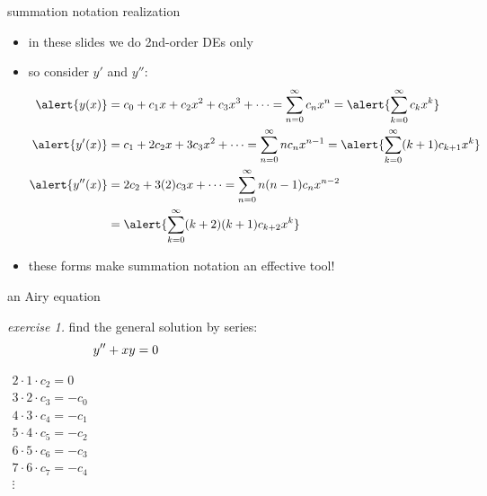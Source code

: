 \documentclass[dvipsnames,colorlinks]{beamer}
\begin{document}
\begin{frame}{summation notation realization}

\begin{itemize}
\item in these slides we do 2nd-order DEs only
\item so consider $y'$ and $y''$:
\small
\begin{align*}
\alert{y(x)} &= c_0 + c_1 x + c_2 x^2 + c_3 x^3 + \dots = \sum_{n=0}^\infty c_n x^n = \alert{\sum_{k=0}^\infty c_k x^k} \\
\alert{y'(x)} &= c_1 + 2 c_2 x + 3 c_3 x^2 + \dots = \sum_{n=0}^\infty n c_n x^{n-1} = \alert{\sum_{k=0}^\infty (k+1) c_{k+1} x^k} \\
\alert{y''(x)} &= 2 c_2 + 3 (2) c_3 x + \dots = \sum_{n=0}^\infty n (n-1) c_n x^{n-2} \\
       &= \alert{\sum_{k=0}^\infty (k+2)(k+1) c_{k+2} x^k}
\end{align*}
\item \alert{these forms} make summation notation an effective tool!
\end{itemize}
\end{frame}


\begin{frame}{an Airy equation}

\noindent \emph{exercise 1.}  find the general solution by series:
    $$y''+xy=0 \hspace{60mm}$$

\vspace{20mm}

\hfill \footnotesize $\displaystyle \boxed{\begin{matrix} 2\cdot 1\cdot c_2 = 0 \\
                                     3\cdot 2\cdot c_3 = -c_0 \\
                                     4\cdot 3\cdot c_4 = -c_1 \\
                                     5\cdot 4\cdot c_5 = -c_2 \\
                                     6\cdot 5\cdot c_6 = -c_3 \\
                                     7\cdot 6\cdot c_7 = -c_4 \\
                                      \vdots \\
                      \end{matrix}}$
\end{frame}
\end{document}
